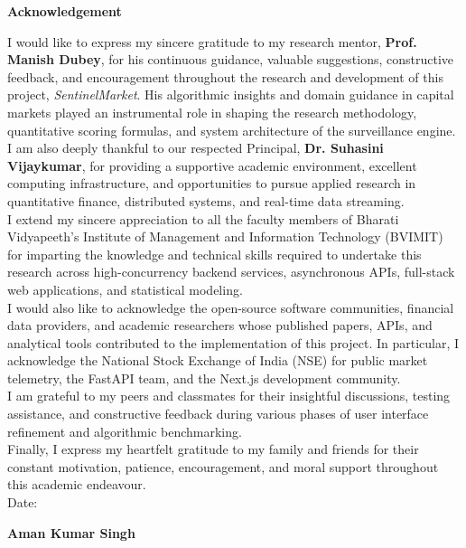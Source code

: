 \begin{center}
{\LARGE \textbf{Acknowledgement}}\\[1.5cm]
\end{center}

\noindent I would like to express my sincere gratitude to my research mentor, \textbf{Prof. Manish Dubey}, for his continuous guidance, valuable suggestions, constructive feedback, and encouragement throughout the research and development of this project, \textit{SentinelMarket}. His algorithmic insights and domain guidance in capital markets played an instrumental role in shaping the research methodology, quantitative scoring formulas, and system architecture of the surveillance engine.\\[0.5cm]

\noindent I am also deeply thankful to our respected Principal, \textbf{Dr. Suhasini Vijaykumar}, for providing a supportive academic environment, excellent computing infrastructure, and opportunities to pursue applied research in quantitative finance, distributed systems, and real-time data streaming.\\[0.5cm]

\noindent I extend my sincere appreciation to all the faculty members of Bharati Vidyapeeth's Institute of Management and Information Technology (BVIMIT) for imparting the knowledge and technical skills required to undertake this research across high-concurrency backend services, asynchronous APIs, full-stack web applications, and statistical modeling.\\[0.5cm]

\noindent I would also like to acknowledge the open-source software communities, financial data providers, and academic researchers whose published papers, APIs, and analytical tools contributed to the implementation of this project. In particular, I acknowledge the National Stock Exchange of India (NSE) for public market telemetry, the FastAPI team, and the Next.js development community.\\[0.5cm]

\noindent I am grateful to my peers and classmates for their insightful discussions, testing assistance, and constructive feedback during various phases of user interface refinement and algorithmic benchmarking.\\[0.5cm]

\noindent Finally, I express my heartfelt gratitude to my family and friends for their constant motivation, patience, encouragement, and moral support throughout this academic endeavour.\\[2.5cm]

\noindent Date:\\[0.8cm]
\begin{flushright}
\textbf{Aman Kumar Singh}
\end{flushright}

\newpage
